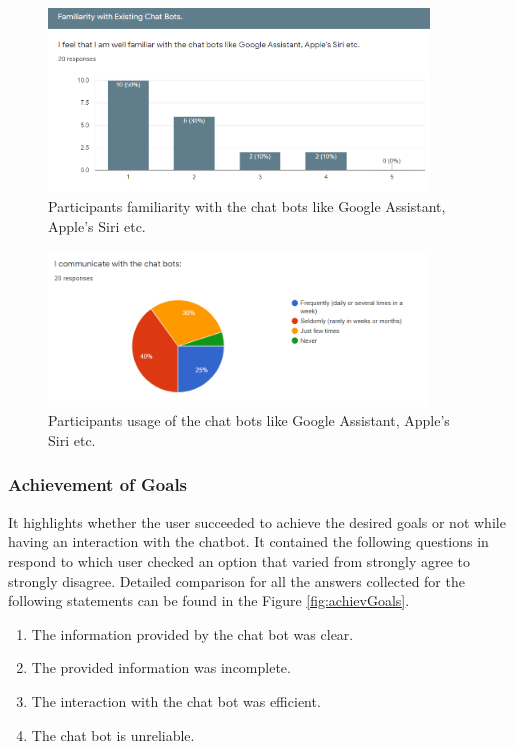 \begin{figure}[!h]
    \centering
    \includegraphics[width=0.9\textwidth]{img/Familiraity.PNG}
    \caption{Participants familiarity with the chat bots like Google Assistant, Apple's Siri etc.}
    \label{fig:familiarity}
\end{figure}

\begin{figure}[!h]
    \centering
    \includegraphics[width=0.9\textwidth]{img/Communicate_Chatbots_Result.PNG}
    \caption{Participants usage of the chat bots like Google Assistant, Apple's Siri etc.}
    \label{fig:commChatRes}
\end{figure}

\subsubsection*{Achievement of Goals}
It highlights whether the user succeeded to achieve the desired goals or not while having an interaction with the chatbot. It contained the following questions in respond to which user checked an option that varied from strongly agree to strongly disagree. Detailed comparison for all the answers collected for the following statements can be found in the Figure \ref{fig:achievGoals}.
\begin{enumerate}
    \item The information provided by the chat bot was clear.
    \item The provided information was incomplete.
    \item The interaction with the chat bot was efficient.
    \item The chat bot is unreliable.
\end{enumerate}

